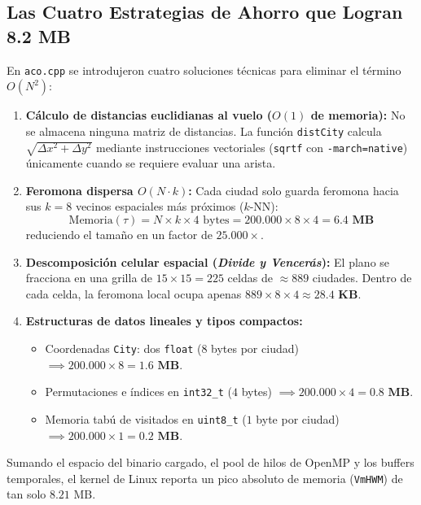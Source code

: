 \documentclass[11pt,a4paper]{article}
\begin{document}
\subsection{Las Cuatro Estrategias de Ahorro que Logran 8.2 MB}
En \texttt{aco.cpp} se introdujeron cuatro soluciones técnicas para eliminar el término $O(N^2)$:
\begin{enumerate}
    \item \textbf{Cálculo de distancias euclidianas al vuelo ($O(1)$ de memoria):} No se almacena ninguna matriz de distancias. La función \texttt{distCity} calcula $\sqrt{\Delta x^2 + \Delta y^2}$ mediante instrucciones vectoriales (\texttt{sqrtf} con \texttt{-march=native}) únicamente cuando se requiere evaluar una arista.
    \item \textbf{Feromona dispersa $O(N \cdot k)$:} Cada ciudad solo guarda feromona hacia sus $k=8$ vecinos espaciales más próximos ($k$-NN):
    \begin{equation}
        \text{Memoria}(\tau) = N \times k \times 4\text{ bytes} = 200.000 \times 8 \times 4 = \mathbf{6.4\text{ MB}}
    \end{equation}
    reduciendo el tamaño en un factor de $25.000\times$.
    \item \textbf{Descomposición celular espacial (\emph{Divide y Vencerás}):} El plano se fracciona en una grilla de $15 \times 15 = 225$ celdas de $\approx 889$ ciudades. Dentro de cada celda, la feromona local ocupa apenas $889 \times 8 \times 4 \approx \mathbf{28.4\text{ KB}}$.
    \item \textbf{Estructuras de datos lineales y tipos compactos:}
    \begin{itemize}
        \item Coordenadas \texttt{City}: dos \texttt{float} ($8$ bytes por ciudad) $\implies 200.000 \times 8 = \mathbf{1.6\text{ MB}}$.
        \item Permutaciones e índices en \texttt{int32\_t} ($4$ bytes) $\implies 200.000 \times 4 = \mathbf{0.8\text{ MB}}$.
        \item Memoria tabú de visitados en \texttt{uint8\_t} ($1$ byte por ciudad) $\implies 200.000 \times 1 = \mathbf{0.2\text{ MB}}$.
    \end{itemize}
\end{enumerate}
Sumando el espacio del binario cargado, el pool de hilos de OpenMP y los buffers temporales, el kernel de Linux reporta un pico absoluto de memoria (\texttt{VmHWM}) de tan solo \textbf{$8.21\text{ MB}$}.

\end{document}
